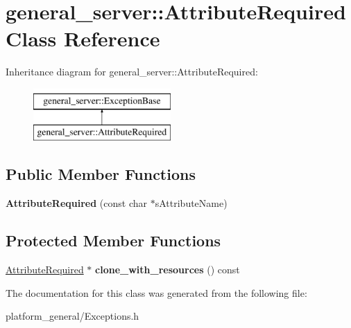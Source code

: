 \hypertarget{classgeneral__server_1_1AttributeRequired}{\section{general\-\_\-server\-:\-:\-Attribute\-Required \-Class \-Reference}
\label{classgeneral__server_1_1AttributeRequired}
}
\-Inheritance diagram for general\-\_\-server\-:\-:\-Attribute\-Required\-:\begin{figure}[H]
\begin{center}
\leavevmode
\includegraphics[height=2.000000cm]{classgeneral__server_1_1AttributeRequired}
\end{center}
\end{figure}
\subsection*{\-Public \-Member \-Functions}
\begin{DoxyCompactItemize}
\item 
\hypertarget{classgeneral__server_1_1AttributeRequired_afa9c61d7eb87e2751785a42e219a8d5f}{{\bfseries \-Attribute\-Required} (const char $\ast$s\-Attribute\-Name)}\label{classgeneral__server_1_1AttributeRequired_afa9c61d7eb87e2751785a42e219a8d5f}

\end{DoxyCompactItemize}
\subsection*{\-Protected \-Member \-Functions}
\begin{DoxyCompactItemize}
\item 
\hypertarget{classgeneral__server_1_1AttributeRequired_ae414dffd6b3f270b26259dc2a186c4aa}{\hyperlink{classgeneral__server_1_1AttributeRequired}{\-Attribute\-Required} $\ast$ {\bfseries clone\-\_\-with\-\_\-resources} () const }\label{classgeneral__server_1_1AttributeRequired_ae414dffd6b3f270b26259dc2a186c4aa}

\end{DoxyCompactItemize}


\-The documentation for this class was generated from the following file\-:\begin{DoxyCompactItemize}
\item 
platform\-\_\-general/\-Exceptions.\-h\end{DoxyCompactItemize}
